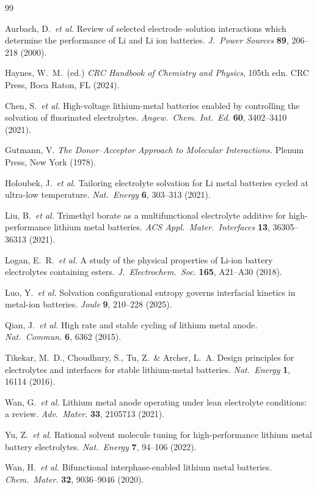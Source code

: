 \documentclass[11pt]{article}
\theoremstyle{plain}
\theoremstyle{definition}
\theoremstyle{remark}
\begin{document}
\begin{thebibliography}{99}

Aurbach, D.\ \textit{et al.}
Review of selected electrode--solution interactions which determine
the performance of Li and Li ion batteries.
\textit{J.\ Power Sources} \textbf{89}, 206--218 (2000).

Haynes, W.\ M.\ (ed.)
\textit{CRC Handbook of Chemistry and Physics}, 105th edn.
CRC Press, Boca Raton, FL (2024).

Chen, S.\ \textit{et al.}
High-voltage lithium-metal batteries enabled by controlling the
solvation of fluorinated electrolytes.
\textit{Angew.\ Chem. Int.\ Ed.} \textbf{60}, 3402--3410 (2021).

Gutmann, V.
\textit{The Donor--Acceptor Approach to Molecular Interactions.}
Plenum Press, New York (1978).

Holoubek, J.\ \textit{et al.}
Tailoring electrolyte solvation for Li metal batteries cycled at
ultra-low temperature.
\textit{Nat.\ Energy} \textbf{6}, 303--313 (2021).

Liu, B.\ \textit{et al.}
Trimethyl borate as a multifunctional electrolyte additive for
high-performance lithium metal batteries.
\textit{ACS Appl.\ Mater.\ Interfaces} \textbf{13}, 36305--36313
(2021).

Logan, E.\ R.\ \textit{et al.}
A study of the physical properties of Li-ion battery electrolytes
containing esters.
\textit{J.\ Electrochem.\ Soc.} \textbf{165}, A21--A30 (2018).

Luo, Y.\ \textit{et al.}
Solvation configurational entropy governs interfacial kinetics in
metal-ion batteries.
\textit{Joule} \textbf{9}, 210--228 (2025).

Qian, J.\ \textit{et al.}
High rate and stable cycling of lithium metal anode.
\textit{Nat.\ Commun.} \textbf{6}, 6362 (2015).

Tikekar, M.\ D., Choudhury, S., Tu, Z.\ \& Archer, L.\ A.
Design principles for electrolytes and interfaces for stable
lithium-metal batteries.
\textit{Nat.\ Energy} \textbf{1}, 16114 (2016).

Wan, G.\ \textit{et al.}
Lithium metal anode operating under lean electrolyte conditions:
a review.
\textit{Adv.\ Mater.} \textbf{33}, 2105713 (2021).

Yu, Z.\ \textit{et al.}
Rational solvent molecule tuning for high-performance lithium metal
battery electrolytes.
\textit{Nat.\ Energy} \textbf{7}, 94--106 (2022).

Wan, H.\ \textit{et al.}
Bifunctional interphase-enabled lithium metal batteries.
\textit{Chem.\ Mater.} \textbf{32}, 9036--9046 (2020).

\end{thebibliography}
\end{document}
